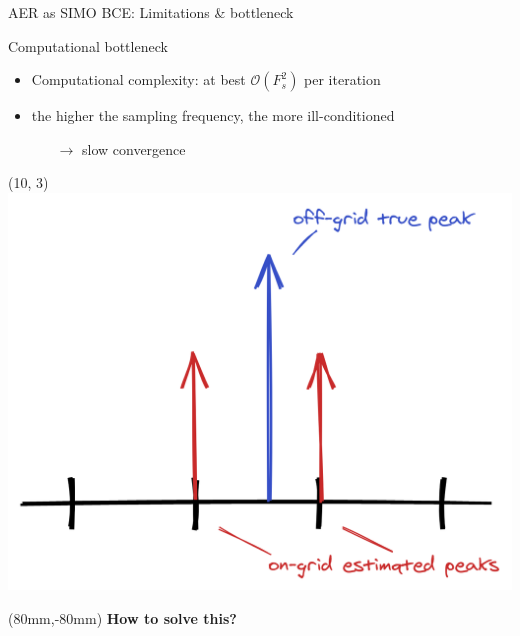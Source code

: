 \begin{frame}{AER as SIMO BCE: Limitations \& bottleneck}
\begin{block}{Computational bottleneck}
\begin{itemize}
        \vspace*{.5em}

        \item Computational complexity: at best $\mathcal{O}(F_s^2)$ per iteration

        \item the higher the sampling frequency, the more ill-conditioned \\
        \begin{itemize}
            \item[$\longrightarrow$] slow convergence
        \end{itemize}
        \end{itemize}

    \end{block}

    \begin{textblock}{5}(10, 3)
        \includegraphics[width=\columnwidth]{figures/bodyguard.png}
    \end{textblock}

    \begin{textblock}{20mm}(80mm,-80mm)
        \textbf{How to solve this?}
    \end{textblock}

\end{frame}



